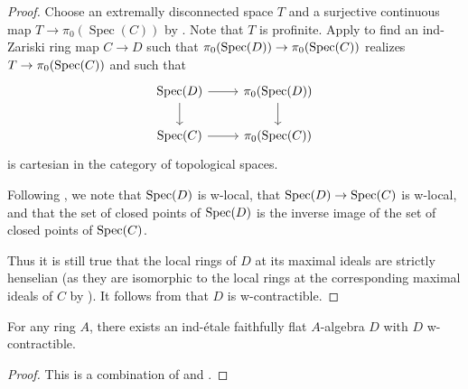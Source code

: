 \begin{proof}

  Choose an extremally disconnected space $T$ and a surjective continuous map $T \to \pi_0(\operatorname{Spec}(C))$ by . Note that $T$ is profinite.
  Apply  to find an ind-Zariski ring map $C \to D$ such that $\pi_0(\operatorname{Spec} (D)) \to \pi_0(\operatorname{Spec} (C))$ realizes $T \to \pi_0(\operatorname{Spec} (C))$ and such that
  \[
  \begin{tikzcd}
  \operatorname{Spec}(D) \arrow[r] \arrow[d] & \pi_0(\operatorname{Spec}(D)) \arrow[d] \\
  \operatorname{Spec}(C) \arrow[r] & \pi_0(\operatorname{Spec}(C))
  \end{tikzcd}
  \]
  is cartesian in the category of topological spaces.

  Following , we note that $\operatorname{Spec} (D)$ is w-local, that $\operatorname{Spec} (D) \to \operatorname{Spec} (C)$ is w-local, and that the set of closed points of $\operatorname{Spec} (D)$ is the inverse image of the set of closed points of $\operatorname{Spec} (C)$.

  Thus it is still true that the local rings of $D$ at its maximal ideals are strictly henselian (as they are isomorphic to the local rings at the corresponding maximal ideals of $C$ by ). It follows from  that $D$ is w-contractible.
\end{proof}

\begin{theorem}
  For any ring $A$, there exists an ind-étale faithfully flat $A$-algebra $D$ with $D$ w-contractible.

  \label{thm:ind-etale-w-contractible-cover-exists}
\end{theorem}

\begin{proof}
  This is a combination of  and .
\end{proof}
